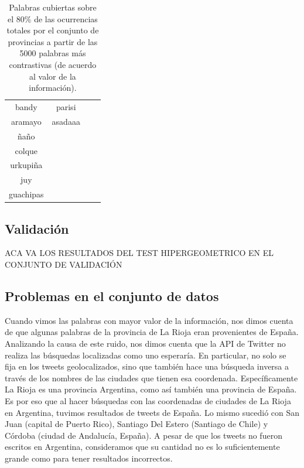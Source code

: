 \begin{table}[]
{\begin{tabular}{|c|c|c|c|}
bandy       & parisi           &                                &                            \\
aramayo     & asadaaa          &                                &                            \\
ñaño        &                  &                                &                            \\
colque      &                  &                                &                            \\
urkupiña    &                  &                                &                            \\
juy         &                  &                                &                            \\
guachipas   &                  &                                &                            \\ \hline
\end{tabular}%
}
\caption{Palabras cubiertas sobre el 80\% de las ocurrencias totales por el conjunto de provincias a partir de las 5000 palabras más contrastivas (de acuerdo al valor de la información).}
\label{tab:palabrasRegiones}
\end{table}


\subsection{Validación}
ACA VA LOS RESULTADOS DEL TEST HIPERGEOMETRICO EN EL CONJUNTO DE VALIDACIÓN

\subsection{Problemas en el conjunto de datos}
\label{sub:problemas_datos}

Cuando vimos las palabras con mayor valor de la información, nos dimos cuenta de que algunas palabras de la provincia de La Rioja eran provenientes de España. Analizando la causa de este ruido, nos dimos cuenta que la API de Twitter no realiza las búsquedas localizadas como uno esperaría. En particular, no solo se fija en los tweets geolocalizados, sino que también hace una búsqueda inversa a través de los nombres de las ciudades que tienen esa coordenada. Específicamente La Rioja es una provincia Argentina, como así también una provincia de España. Es por eso que al hacer búsquedas con las coordenadas de ciudades de La Rioja en Argentina, tuvimos resultados de tweets de España. Lo mismo sucedió con San Juan (capital de Puerto Rico), Santiago Del Estero (Santiago de Chile) y Córdoba (ciudad de Andalucía, España). A pesar de que los tweets no fueron escritos en Argentina, consideramos que su cantidad no es lo suficientemente grande como para tener resultados incorrectos.

